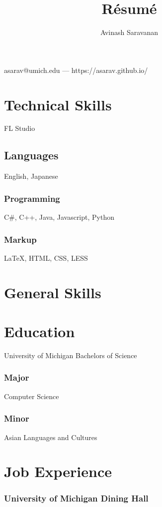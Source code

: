 \documentclass{article}
\makeatletter
\renewcommand{\maketitle}{
\begin{center}
{\huge\bfseries
\theauthor}

\vspace{.25em}

asarav@umich.edu --- https://asarav.github.io/

\end{center}
}
\makeatother
\begin{document}
\title{R\'esum\'e}
\author{Avinash Saravanan}

\maketitle

\section{Technical Skills}
FL Studio

\subsection{Languages}

English, Japanese

\subsubsection{Programming}

C\#, C++, Java, Javascript, Python

\subsubsection{Markup}

{\LaTeX}, HTML, CSS, LESS

\section{General Skills}

\section{Education}
University of Michigan Bachelors of Science
\subsubsection{Major}
Computer Science
\subsubsection{Minor}
Asian Languages and Cultures

\section{Job Experience}

\subsubsection{University of Michigan Dining Hall}
\end{document}
